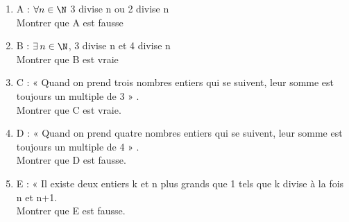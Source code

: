 \begin{exercice}
	\begin{enumerate}
		\item 	A : $\forall n \in \N$ 3 divise n ou 2 divise n\\
		      Montrer que A est fausse
		\item 	B : $\exists\, n \in \N$, 3 divise n et 4 divise n\\
		      Montrer que B est vraie
		\item 	C :  «  Quand on prend trois nombres entiers qui se suivent, leur somme est toujours un multiple de 3  » .\\
		      Montrer que C est vraie.
		      
		\item 	D :  «  Quand on prend quatre nombres entiers qui se suivent, leur somme est toujours un multiple de 4  » .\\
		      Montrer que D est fausse.
		\item 	E :  «  Il existe deux entiers k et n plus grands que 1 tels que k divise à la fois n et n+1.\\
		      Montrer que E est fausse.
	\end{enumerate}
\end{exercice}
